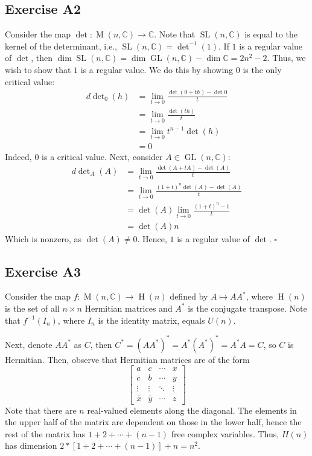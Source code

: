 \documentclass{article}
\newcommand{\C}{\mathbb{C}}
\DeclareMathOperator{\M}{M}
\DeclareMathOperator{\He}{H}
\DeclareMathOperator{\GL}{GL}
\DeclareMathOperator{\SL}{SL}
\begin{document}
\subsection*{Exercise A2}
  Consider the map $\det\colon\M(n,\C)\to\C$. Note that $\SL(n,\C)$ is equal to
  the kernel of the determinant, i.e., $\SL(n,\C)=\det^{-1}(1)$. If $1$ is a
  regular value of $\det$, then $\dim\SL(n,\C)=\dim\GL(n,\C)-\dim\C=2n^2-2$.
  Thus, we wish to show that $1$ is a regular value. We do this by showing $0$
  is the only critical value:
  \begin{align*}
    d\det\nolimits_0(h) &= \lim_{t\to0}\frac{\det(0+th)-\det0}{t}\\
                        &= \lim_{t\to0}\frac{\det(th)}{t}\\
                        &= \lim_{t\to0}t^{n-1}\det(h)\\
                        &= 0
  \end{align*}
  Indeed, $0$ is a critical value. Next, consider $A\in\GL(n,\C)$:
  \begin{align*}
    d\det\nolimits_A(A) &= \lim_{t\to 0}\frac{\det(A+tA)-\det(A)}{t}\\
                        &= \lim_{t\to 0}\frac{(1+t)^n\det(A)-\det(A)}{t}\\
                        &= \det(A)\lim_{t\to 0}\frac{(1+t)^n-1}{t}\\
                        &= \det(A)n
  \end{align*}
  Which is nonzero, as $\det(A)\ne0$. Hence, $1$ is a regular value of $\det$.
  \hfill $\square$

\subsection*{Exercise A3}
  Consider the map $f\colon\M(n,\C)\to\He(n)$ defined by $A\mapsto AA^*$,
  where $\He(n)$ is the set of all $n\times n$ Hermitian matrices and $A^*$ is
  the conjugate transpose. Note that $f^{-1}(I_n)$, where $I_n$ is the identity
  matrix, equals $U(n)$.

  Next, denote $AA^*$ as $C$, then $C^*=(AA^*)^*=A^*(A^*)^*=A^*A=C$, so $C$ is
  Hermitian. Then, observe that Hermitian matrices are of the form
  \begin{equation*}
    \begin{bmatrix}
      a       & c       & \cdots & x\\
      \bar{c} & b       & \cdots & y\\
      \vdots  & \vdots  & \ddots & \vdots\\
      \bar{x} & \bar{y} & \cdots & z
    \end{bmatrix}
  \end{equation*}
  Note that there are $n$ real-valued elements along the diagonal. The elements
  in the upper half of the matrix are dependent on those in the lower half,
  hence the rest of the matrix has $1+2+\cdots+(n-1)$ free complex variables.
  Thus, $H(n)$ has dimension $2*[1+2+\cdots+(n-1)]+n=n^2$.
\end{document}
